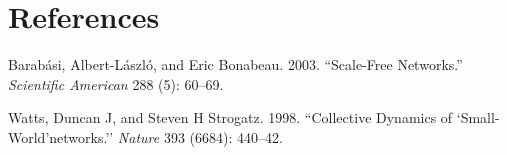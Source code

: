 \documentclass[
]{article}
\newlength{\cslhangindent}
\newlength{\cslentryspacingunit} %
\newenvironment{CSLReferences}[2] %
 {%
  \setlength{\parindent}{0pt}
  \ifodd #1
  \let\oldpar\par
  \def\par{\hangindent=\cslhangindent\oldpar}
  \fi
  \setlength{\parskip}{#2\cslentryspacingunit}
 }%
 {}
\begin{document}
\newpage
\section*{References}

\hypertarget{refs}{}
\begin{CSLReferences}{1}{0}
\leavevmode{}%
Barabási, Albert-László, and Eric Bonabeau. 2003. {``Scale-Free
Networks.''} \emph{Scientific American} 288 (5): 60--69.

\leavevmode{}%
Watts, Duncan J, and Steven H Strogatz. 1998. {``Collective Dynamics of
`Small-World'networks.''} \emph{Nature} 393 (6684): 440--42.

\end{CSLReferences}
\end{document}
